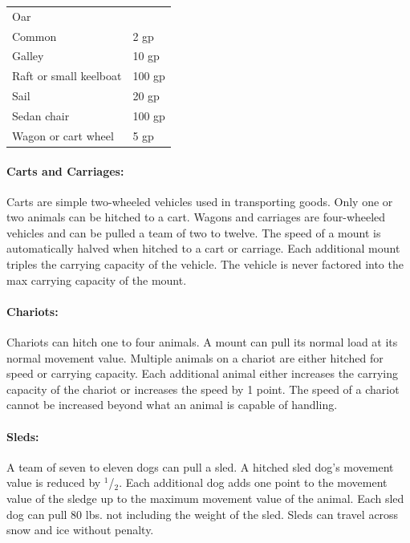 \begin{multicols}{2}
\begin{minipage}{\columnwidth}
\begin{tabular}{|p{}|p{}|}
Oar					&  \\
\hspace{1em}Common			& 2 gp \\
\rowcolor[gray]{.9}\hspace{1em}Galley			& 10 gp \\
Raft or small keelboat	& 100 gp \\
\rowcolor[gray]{.9}Sail				& 20 gp \\
Sedan chair			& 100 gp \\
\rowcolor[gray]{.9}Wagon or cart wheel	& 5 gp \\
\hline
\end{tabular}

\end{minipage}

\paragraph{Carts and Carriages:} Carts are simple two-wheeled vehicles used in transporting goods.  Only one or two animals can be hitched to a cart.  Wagons and carriages are four-wheeled vehicles and can be pulled a team of two to twelve.  The speed of a mount is automatically halved when hitched to a cart or carriage.  Each additional mount triples the carrying capacity of the vehicle.  The vehicle is never factored into the max carrying capacity of the mount.

\paragraph{Chariots:} Chariots can hitch one to four animals.  A mount can pull its normal load at its normal movement value.  Multiple animals on a chariot are either hitched for speed or carrying capacity.  Each additional animal either increases the carrying capacity of the chariot or increases the speed by 1 point.  The speed of a chariot cannot be increased beyond what an animal is capable of handling.

\paragraph{Sleds:} A team of seven to eleven dogs can pull a sled.  A hitched sled dog's movement value is reduced by $^1$/$_2$.  Each additional dog adds one point to the movement value of the sledge up to the maximum movement value of the animal.  Each sled dog can pull 80 lbs. not including the weight of the sled.  Sleds can travel across snow and ice without penalty.
 

\end{multicols}
